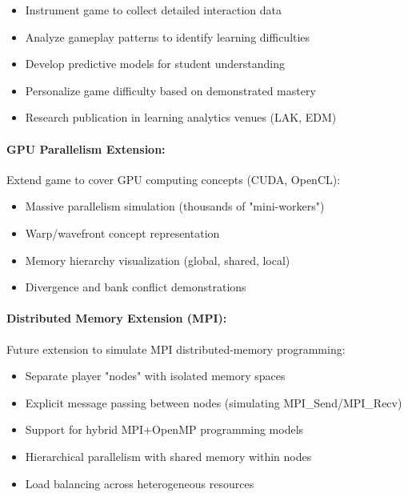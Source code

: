 \begin{itemize}
    \item Instrument game to collect detailed interaction data
    \item Analyze gameplay patterns to identify learning difficulties
    \item Develop predictive models for student understanding
    \item Personalize game difficulty based on demonstrated mastery
    \item Research publication in learning analytics venues (LAK, EDM)
\end{itemize}

\paragraph*{GPU Parallelism Extension:}

Extend game to cover GPU computing concepts (CUDA, OpenCL):

\begin{itemize}
    \item Massive parallelism simulation (thousands of "mini-workers")
    \item Warp/wavefront concept representation
    \item Memory hierarchy visualization (global, shared, local)
    \item Divergence and bank conflict demonstrations
\end{itemize}

\paragraph*{Distributed Memory Extension (MPI):}

Future extension to simulate MPI distributed-memory programming:

\begin{itemize}
    \item Separate player "nodes" with isolated memory spaces
    \item Explicit message passing between nodes (simulating MPI\_Send/MPI\_Recv)
    \item Support for hybrid MPI+OpenMP programming models
    \item Hierarchical parallelism with shared memory within nodes
    \item Load balancing across heterogeneous resources
\end{itemize}

